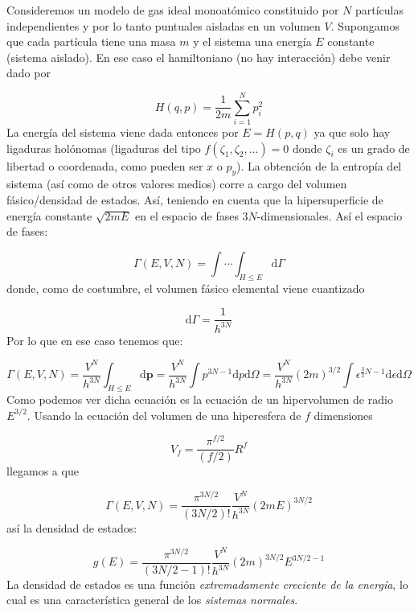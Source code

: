 \documentclass[12pt,a4paper]{article}
\numberwithin{equation}{section}
\numberwithin{figure}{section}
\newcommand{\D}{\mathrm{d}}
\newcommand{\pn}{\mathbf{p}}
\theoremstyle{definition}
\begin{document}
Consideremos un modelo de gas ideal monoatómico constituido por $N$ partículas independientes y por lo tanto puntuales aisladas en un volumen $V$. Supongamos que cada partícula tiene una masa $m$ y el sistema una energía $E$ constante (sistema aislado). En ese caso el hamiltoniano (no hay interacción) debe venir dado por

\begin{equation}
H (q,p) = \frac{1}{2m} \sum_{i=1}^N p^2_i
\end{equation}
La energía del sistema viene dada entonces por $E=H(p,q)$ ya que solo hay ligaduras holónomas (ligaduras del tipo $f(\zeta_1,\zeta_2,...)=0$ donde $\zeta_i$ es un grado de libertad o coordenada, como pueden ser $x$ o $p_y$). La obtención de la entropía del sistema (así como de otros valores medios) corre a cargo del volumen fásico/densidad de estados. Así, teniendo en cuenta que la hipersuperficie de energía constante $\sqrt{2mE}$ en el espacio de fases $3N$-dimensionales. Así el espacio de fases: 

\begin{equation}
\Gamma (E,V,N) = \int \cdots \int_{H\leq E} \D \Gamma
\end{equation}
donde, como de costumbre, el volumen fásico elemental viene cuantizado

\begin{equation}
\D \Gamma = \frac{1}{h^{3N}} 
\end{equation}
Por lo que en ese caso tenemos que:

\begin{equation}
\Gamma (E,V,N) = \frac{V^N}{h^{3N}} \int_{H\leq E}  \D \pn = \frac{V^N}{h^{3N}} \int p^{3N-1} \D p \D \Omega = \frac{V^N}{h^{3N}} (2m)^{3/2} \int \epsilon^{\frac{3}{2}N-1} \D \epsilon \D \Omega
\end{equation}
Como podemos ver dicha ecuación es la ecuación de un hipervolumen de radio $E^{3/2}$. Usando la ecuación del volumen de una hiperesfera de $f$ dimensiones

\begin{equation}
V_f = \frac{\pi^{f/2}}{(f/2)} R^f
\end{equation}
llegamos a que

\begin{equation}
\Gamma (E,V,N) = \frac{\pi^{3N/2}}{(3N/2)!} \frac{V^N}{h^{3N}} (2mE)^{3N/2}
\end{equation}
así la densidad de estados:

\begin{equation}
g(E) = \frac{\pi^{3N/2}}{(3N/2-1)!} \frac{V^N}{h^{3N}} (2m)^{3N/2} E^{3N/2-1}
\end{equation}
La densidad de estados es una función \textit{extremadamente creciente de la energía}, lo cual es una característica general de los \textit{sistemas normales}. \\
\end{document}
